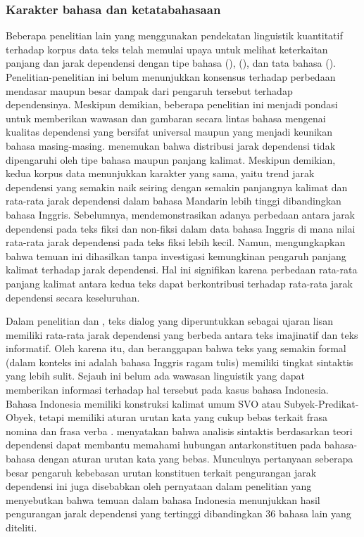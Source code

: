 \subsubsection{Karakter bahasa dan ketatabahasaan}
Beberapa penelitian lain yang menggunakan pendekatan linguistik kuantitatif terhadap korpus data teks telah memulai upaya untuk melihat keterkaitan panjang dan jarak dependensi dengan tipe bahasa (\citealp{hiranuma1999syntactic, eppler2005syntax, liu2012quantitative}), (\citealp{oya2011syntactic, ferrer2014risks, jiang2015effects}), dan tata bahasa (\citealp{liu2008dependency, gildea2010grammars}). Penelitian-penelitian ini belum menunjukkan konsensus terhadap perbedaan mendasar maupun besar dampak dari pengaruh tersebut terhadap dependensinya. Meskipun demikian, beberapa penelitian ini menjadi pondasi untuk memberikan wawasan dan gambaran secara lintas bahasa mengenai kualitas dependensi yang bersifat universal maupun yang menjadi keunikan bahasa masing-masing. \cite{jiang2015effects} menemukan bahwa distribusi jarak dependensi tidak dipengaruhi oleh tipe bahasa maupun panjang kalimat. Meskipun demikian, kedua korpus data menunjukkan karakter yang sama, yaitu trend jarak dependensi yang semakin naik seiring dengan semakin panjangnya kalimat dan rata-rata jarak dependensi dalam bahasa Mandarin lebih tinggi dibandingkan bahasa Inggris. Sebelumnya, \cite{oya2013degree} mendemonstrasikan adanya perbedaan antara jarak dependensi pada teks fiksi dan non-fiksi dalam data bahasa Inggris di mana nilai rata-rata jarak dependensi pada teks fiksi lebih kecil. Namun, \cite{wang2017effects} mengungkapkan bahwa temuan ini dihasilkan tanpa investigasi kemungkinan pengaruh panjang kalimat terhadap jarak dependensi. Hal ini signifikan karena perbedaan rata-rata panjang kalimat antara kedua teks dapat berkontribusi terhadap rata-rata jarak dependensi secara keseluruhan.

Dalam penelitian \cite{hiranuma1999syntactic} dan \cite{liu2009chinese}, teks dialog yang diperuntukkan sebagai ujaran lisan memiliki rata-rata jarak dependensi yang berbeda antara teks imajinatif dan teks informatif. Oleh karena itu, \cite{hiranuma1999syntactic} dan \cite{liu2009chinese} beranggapan bahwa teks yang semakin formal (dalam konteks ini adalah bahasa Inggris ragam tulis) memiliki tingkat sintaktis yang lebih sulit. Sejauh ini belum ada wawasan linguistik yang dapat memberikan informasi terhadap hal tersebut pada kasus bahasa Indonesia. Bahasa Indonesia memiliki konstruksi kalimat umum SVO atau Subyek-Predikat-Obyek, tetapi memiliki aturan urutan kata yang cukup bebas terkait frasa nomina dan frasa verba \citep{irmawati2015dependency}. \cite{kubler2009dependency} menyatakan bahwa analisis sintaktis berdasarkan teori dependensi dapat membantu memahami hubungan antarkonstituen pada bahasa-bahasa dengan aturan urutan kata yang bebas. Munculnya pertanyaan seberapa besar pengaruh kebebasan urutan konstituen terkait pengurangan jarak dependensi ini juga disebabkan oleh pernyataan dalam penelitian \cite{futrell2015large} yang menyebutkan bahwa temuan dalam bahasa Indonesia menunjukkan hasil pengurangan jarak dependensi yang tertinggi dibandingkan 36 bahasa lain yang diteliti.

